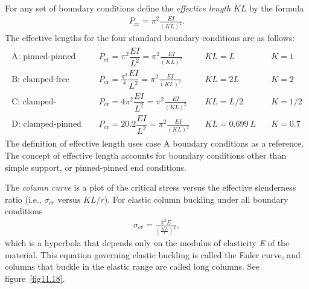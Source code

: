 \documentclass{AeroStructure-ERJohnson}
\begin{document}
For any set of boundary conditions define the \textit{effective length} $K L$ by the formula
\begin{align}\label{eq11.92}
P_{\textrm{cr}}=\pi^{2} \frac{E I}{(K L)^{2}}.
\end{align}
The effective lengths for the four standard boundary conditions are as follows:
\begin{align*}
\begin{array}{llll}
\textrm{A: pinned-pinned } &\quad P_{\textrm{cr}}=\pi^{2} \dfrac{E I}{L^{2}}=\pi^{2} \frac{E I}{(K L)^{2}}&\quad K L=L&\quad K=1 \\[6pt]
\textrm{B: clamped-free }&\quad P_{\textrm{cr}}=\frac{\pi^{2}}{4}\dfrac{E I}{L^{2}}=\pi^{2} \frac{E I}{(K L)^{2}}&\quad K L=2 L&\quad K=2\\[6pt]
\textrm{C: clamped-clamped }&\quad P_{\textrm{cr}}=4 \pi^{2} \dfrac{E I}{L^{2}}=\pi^{2} \frac{E I}{(K L)^{2}}&\quad K L=L/2&\quad K=1/2 \\[6pt]
\textrm{D: clamped-pinned }&\quad P_{\textrm{cr}}=20.2 \dfrac{E I}{L^{2}}=\pi^{2} \frac{E I}{(K L)^{2}}&\quad KL=0.699~L&\quad K=0.7
\end{array}
\end{align*}
The definition of effective length uses case A boundary conditions as a reference. The concept of effective length accounts for boundary conditions other than simple support, or pinned-pinned end conditions.

The \textit{column curve} is a plot of the critical stress versus the effective slenderness ratio (i.e., $\sigma_{cr} \text { versus } K L/r$). For elastic column buckling under all boundary conditions
\begin{align}\label{eq11.93}
\sigma_{\textrm{cr}}=\frac{\pi^{2} E}{\left(\frac{K L}{r}\right)^{2}},
\end{align}
which is a hyperbola that depends only on the modulus of elasticity \textit{E} of the material. This equation governing elastic buckling is called the Euler curve, and columns that buckle in the elastic range are called long columns. See figure~\ref{fig11.18}.

\end{document}
